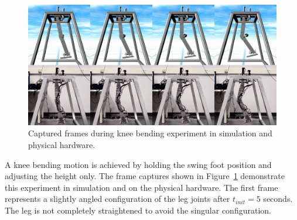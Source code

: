 \begin{figure}[!b]
	\centering
    \includegraphics[scale=0.22]{fig/experiments/kneebendframes.png} 
  	\caption{Captured frames during knee bending experiment in simulation and physical hardware.}
	\label{fig:kneebendframes}
\end{figure}

A knee bending motion is achieved by holding the swing foot position and adjusting the height only. The frame captures shown in Figure~\ref{fig:kneebendframes} demonstrate this experiment in simulation and on the physical hardware. The first frame represents a slightly angled configuration of the leg joints after $t_{init} = 5$ seconds. The leg is not completely straightened to avoid the singular configuration. 

